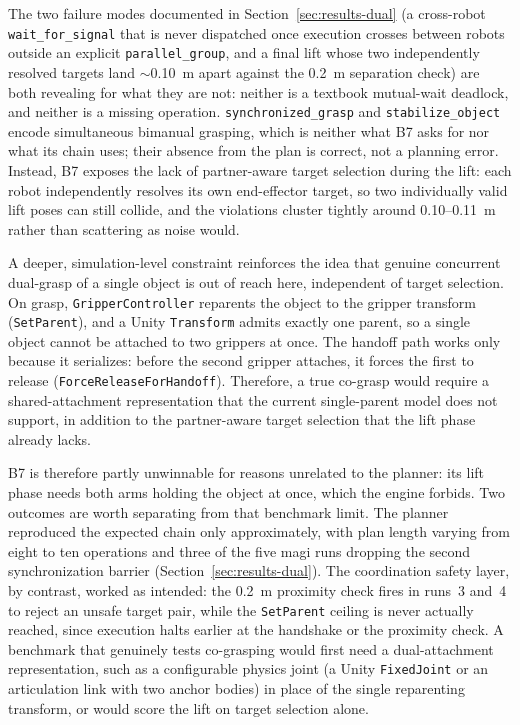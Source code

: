 \documentclass[
     12pt,
     a4paper,
     BCOR=10mm,
     DIV=14,
     listof=totoc,
     bibliography=totoc,
     parskip,
     twoside,
     headsepline
     ]{scrreprt}
\begin{document}
The two failure modes documented in Section~\ref{sec:results-dual} (a cross-robot \texttt{wait\_for\_signal} that is never dispatched once execution crosses between robots outside an explicit \texttt{parallel\_group}, and a final lift whose two independently resolved targets land $\sim$0.10~m apart against the 0.2~m separation check) are both revealing for what they are not: neither is a textbook mutual-wait deadlock, and neither is a missing operation. \texttt{synchronized\_grasp} and \texttt{stabilize\_object} encode simultaneous bimanual grasping, which is neither what B7 asks for nor what its chain uses; their absence from the plan is correct, not a planning error. Instead, B7 exposes the lack of partner-aware target selection during the lift: each robot independently resolves its own end-effector target, so two individually valid lift poses can still collide, and the violations cluster tightly around 0.10--0.11~m rather than scattering as noise would.

A deeper, simulation-level constraint reinforces the idea that genuine concurrent dual-grasp of a single object is out of reach here, independent of target selection. On grasp, \texttt{GripperController} reparents the object to the gripper transform (\texttt{SetParent}), and a Unity \texttt{Transform} admits exactly one parent, so a single object cannot be attached to two grippers at once. The handoff path works only because it serializes: before the second gripper attaches, it forces the first to release (\texttt{ForceReleaseForHandoff}). Therefore, a true co-grasp would require a shared-attachment representation that the current single-parent model does not support, in addition to the partner-aware target selection that the lift phase already lacks.

B7 is therefore partly unwinnable for reasons unrelated to the planner: its lift phase needs both arms holding the object at once, which the engine forbids. Two outcomes are worth separating from that benchmark limit. The planner reproduced the expected chain only approximately, with plan length varying from eight to ten operations and three of the five \gls{magi} runs dropping the second synchronization barrier (Section~\ref{sec:results-dual}). The coordination safety layer, by contrast, worked as intended: the 0.2~m proximity check fires in runs~3 and~4 to reject an unsafe target pair, while the \texttt{SetParent} ceiling is never actually reached, since execution halts earlier at the handshake or the proximity check. A benchmark that genuinely tests co-grasping would first need a dual-attachment representation, such as a configurable physics joint (a Unity \texttt{FixedJoint} or an articulation link with two anchor bodies) in place of the single reparenting transform, or would score the lift on target selection alone.
\end{document}
